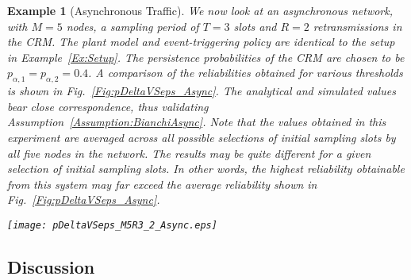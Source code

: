 \documentclass[journal]{IEEEtran}
\newtheorem{example}{Example}[section]
\begin{document}
\begin{example}[Asynchronous Traffic] \label{Ex:Async}
We now look at an asynchronous network, with $M=5$ nodes, a sampling period of $T=3$ slots and $R=2$ retransmissions in the CRM. The plant model and event-triggering policy are identical to the setup in Example~\ref{Ex:Setup}. The persistence probabilities of the CRM are chosen to be $p_{\alpha,1} = p_{\alpha,2} = 0.4$. A comparison of the reliabilities obtained for various thresholds is shown in Fig.~\ref{Fig:pDeltaVSeps_Async}. The analytical and simulated values bear close correspondence, thus validating Assumption~\ref{Assumption:BianchiAsync}. Note that the values obtained in this experiment are averaged across all possible selections of initial sampling slots by all five nodes in the network. The results may be quite different for a given selection of initial sampling slots. In other words, the highest reliability obtainable from this system may far exceed the average reliability shown in Fig.~\ref{Fig:pDeltaVSeps_Async}.
\begin{figure*}[tb]
\begin{center}
\texttt{[image: pDeltaVSeps\_M5R3\_2\_Async.eps]}
\caption{A comparison of the analytical and simulated values of the reliability versus the event-triggering threshold, for an asynchronous network. The network consists of $5$ nodes, with sampling periods of $3$ slots and $2$ retransmissions in the CRM. The reliability obtained through analysis and simulations is averaged across all possible selections of initial sampling slots by the $5$ nodes in the network. This plot validates Assumption~\ref{Assumption:BianchiAsync}.} \label{Fig:pDeltaVSeps_Async}
\end{center}
\end{figure*}
\end{example}


\subsection{Discussion}
\end{document}
